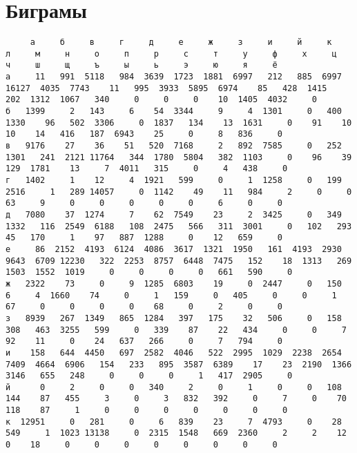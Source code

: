\documentclass{article}
\begin{document}
\section{Биграмы}
\tiny
\begin{addmargin}{-4em}
 \begin{verbatim}
     а     б     в     г     д     е     ж     з     и     й     к     л     м     н     о     п     р     с     т     у     ф     х     ц     ч     ш     щ     ъ     ы     ь     э     ю     я     ё    
а     11   991  5118   984  3639  1723  1881  6997   212   885  6997 16127  4035  7743    11   995  3933  5895  6974    85   428  1415   202  1312  1067   340     0     0     0    10  1405  4032     0
б   1399     2   143     6    54  3344     9     4  1301     0   400  1330    96   502  3306     0  1837   134    13  1631     0    91    10    10    14   416   187  6943    25     0     8   836     0
в   9176    27    36    51   520  7168     2   892  7585     0   252  1301   241  2121 11764   344  1780  5804   382  1103     0    96    39   129  1781    13     7  4011   315     0     4   438     0
г   1402     1    12     4  1921   599     0     1  1258     0   199  2516     1   289 14057     0  1142    49    11   984     2     0     0    63     9     0     0     0     0     0     6     0     0
д   7080    37  1274     7    62  7549    23     2  3425     0   349  1332   116  2549  6188   108  2475   566   311  3001     0   102   293    45   170     1    97   887  1288     0    12   659     0
е     86  2152  4193  6124  4086  3617  1321  1950   161  4193  2930  9643  6709 12230   322  2253  8757  6448  7475   152    18  1313   269  1503  1552  1019     0     0     0     0   661   590     0
ж   2322    73     0     9  1285  6803    19     0  2447     0   150     6     4  1660    74     0     1   159     0   405     0     0     1    67     0     0     0     0    68     0     2     0     0
з   8939   267  1349   865  1284   397   175    32   506     0   158   308   463  3255   599     0   339    87    22   434     0     0     7    92    11     0    24   637   266     0     7   794     0
и    158   644  4450   697  2582  4046   522  2995  1029  2238  2654  7409  4664  6906   154   233   895  3587  6389    17    23  2190  1366  3146   655   248     0     0     0     1   417  2905     0
й      0     2     0     0   340     2     0     1     0     0   108   144    87   455     3     0     3   832   392     0     7     0    70   118    87     1     0     0     0     0     0     0     0
к  12951     0   281     0     6   839    23     7  4793     0    28   549     1  1023 13138     0  2315  1548   669  2360     2     2    12     0    18     0     0     0     0     0     0     0     0

\end{verbatim}
\end{addmargin}
\end{document}
